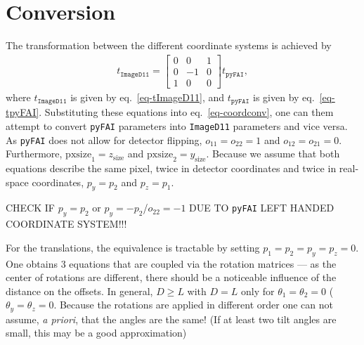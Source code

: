 \documentclass[12pt]{article}
\begin{document}
\section{Conversion}

The transformation between the different coordinate systems is
achieved by
\begin{align}
  t_{\mathtt{ImageD11}}
  =
  \begin{bmatrix}
    0 & 0 & 1 \\ 0 & -1 & 0 \\ 1 & 0 & 0
  \end{bmatrix}
  t_{\mathtt{pyFAI}},
  \label{eq-coordconv}
\end{align}
where $t_{\mathtt{ImageD11}}$ is given by eq.~\ref{eq-tImageD11}, and
$t_{\mathtt{pyFAI}}$ is given by eq.~\ref{eq-tpyFAI}. Substituting
these equations into eq.~\ref{eq-coordconv}, one can them attempt to
convert \texttt{pyFAI} parameters into \texttt{ImageD11} parameters
and vice versa. As \texttt{pyFAI} does not allow for detector
flipping, $o_{11}=o_{22}=1$ and $o_{12}=o_{21}=0$. Furthermore,
$\mathrm{pxsize}_1 = z_{\mathrm{size}}$ and $\mathrm{pxsize}_2 =
y_{\mathrm{size}}$. Because we assume that both equations describe the
same pixel, twice in detector coordinates and twice in real-space
coordinates, $p_y = p_2$ and $p_z = p_1$.

CHECK IF $p_y = p_2$ or $p_y = - p_2$/$o_{22}=-1$ DUE TO
\texttt{pyFAI} LEFT HANDED COORDINATE SYSTEM!!!

For the translations, the equivalence is tractable by setting $p_1 =
p_2 = p_y = p_z = 0$. One obtains 3 equations that are coupled via the
rotation matrices --- as the center of rotations are different, there
should be a noticeable influence of the distance on the offsets. In
general, $D \geq L$ with $D=L$ only for $\theta_1=\theta_2=0$
($\theta_y = \theta_z = 0$. Because the rotations are applied in
different order one can not assume, \emph{a priori}, that the angles
are the same! (If at least two tilt angles are small, this may be a
good approximation)
\end{document}
